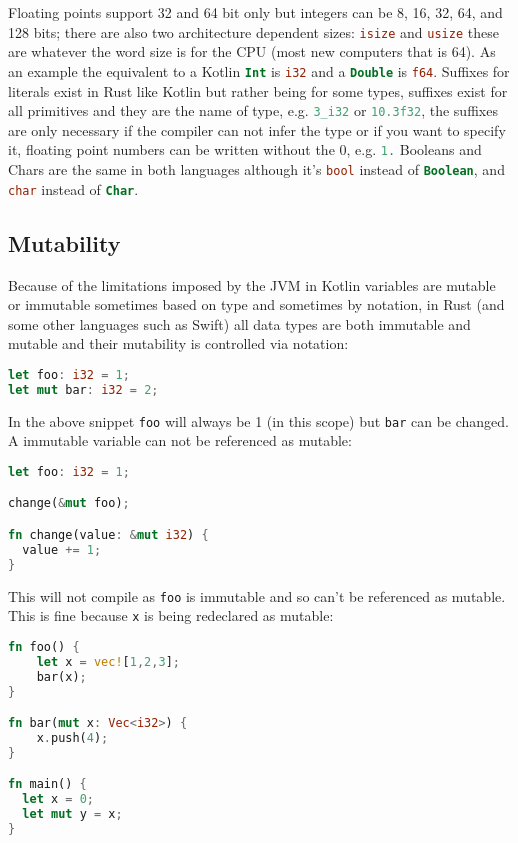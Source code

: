 \documentclass[a4paper,11pt]{article}
\begin{document}
\renewcommand{\arraystretch}{1}
Floating points support 32 and 64 bit only but integers can be 8, 16, 32, 64, and 128 bits; there are also two architecture dependent sizes: \lstinline[language=Rust]{isize} and \lstinline[language=Rust]{usize} these are whatever the word size is for the CPU (most new computers that is 64). As an example the equivalent to a Kotlin \lstinline[language=Kotlin]{Int} is \lstinline[language=Rust]{i32} and a \lstinline[language=Kotlin]{Double} is \lstinline[language=Rust]{f64}. 
\newline
Suffixes for literals exist in Rust like Kotlin but rather being for some types, suffixes exist for all primitives and they are the name of type, e.g. \lstinline[language=Rust]{3_i32} or \lstinline[language=Rust]{10.3f32}, the suffixes are only necessary if the compiler can not infer the type or if you want to specify it, floating point numbers can be written without the 0, e.g. \lstinline[language=Rust]{1.}
\newline
Booleans and Chars are the same in both languages although it's \lstinline[language=Rust]{bool} instead of \lstinline[language=Kotlin]{Boolean}, and \lstinline[language=Rust]{char} instead of \lstinline[language=Kotlin]{Char}.

\subsection{Mutability}
Because of the limitations imposed by the JVM in Kotlin variables are mutable or immutable sometimes based on type and sometimes by notation, in Rust (and some other languages such as Swift) all data types are both immutable and mutable and their mutability is controlled via notation:
\begin{lstlisting}[language=Rust,frame=single]
let foo: i32 = 1;
let mut bar: i32 = 2;
\end{lstlisting}
In the above snippet \lstinline{foo} will always be 1 (in this scope) but \lstinline{bar} can be changed. A immutable variable can not be referenced as mutable:
\begin{lstlisting}[language=Rust,frame=single,backgroundcolor=\color{palered}]
let foo: i32 = 1;

change(&mut foo);

fn change(value: &mut i32) {
  value += 1;
}
\end{lstlisting}
This will not compile as \lstinline{foo} is immutable and so can't be referenced as mutable.
\newline
This is fine because \lstinline{x} is being redeclared as mutable:
\begin{lstlisting}[language=Rust,frame=single]
fn foo() {
    let x = vec![1,2,3];
    bar(x);
}

fn bar(mut x: Vec<i32>) {
    x.push(4);
}

fn main() {
  let x = 0;
  let mut y = x;
}
\end{lstlisting}
\end{document}
